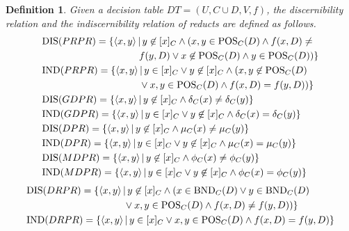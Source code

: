 \documentclass[review]{elsarticle}
\newtheorem{myDef}{Definition}
\begin{document}
		\begin{myDef}
			Given a decision table $DT=(U,C \cup D,V,f)$, the discernibility relation and the indiscernibility relation of reducts are defined as follows.
			\begin{subequations}\begin{align}
					&{\rm DIS}(PRPR)=\{\langle x,y\rangle \,|\, y \not \in [x]_C \wedge (x,y \in {\rm POS}_C(D) \wedge f(x,D) \neq  \notag \\
					&\quad \quad \quad \quad \quad \quad \quad \quad \quad \quad f(y,D) \vee  x \not \in {\rm POS}_C(D) \wedge y \in {\rm POS}_C(D))\}\notag\\
					&{\rm IND}(PRPR)=\{\langle x,y\rangle \,|\,y \in [x]_C \vee y \not \in [x]_C \wedge (x,y \not \in {\rm POS}_C(D) \notag \\
					&\quad \quad \quad \quad \quad \quad \quad \quad \quad \quad \vee x,y \in {\rm POS}_C(D) \wedge f(x,D)=f(y,D) )  \}\notag\\
					&{\rm DIS}(GDPR)=\{ \langle x,y\rangle \,|\,y \not \in [x]_C \wedge \delta_C(x) \neq \delta_C(y) \}\notag\\
					&{\rm IND}(GDPR)=\{\langle x,y\rangle \,|\,y \in [x]_C \vee y \not \in [x]_C \wedge \delta_C(x) = \delta_C(y)\}\notag\\					
					&{\rm DIS}(DPR)=\{\langle x,y\rangle \,|\,y \not \in [x]_C \wedge \mu_C(x) \neq \mu_C(y)\}\notag\\
					&{\rm IND}(DPR)=\{\langle x,y\rangle \,|\,y \in [x]_C \vee y \not \in [x]_C \wedge \mu_C(x) =\mu_C(y)\}\notag\\	
					&{\rm DIS}(MDPR)=\{\langle x,y\rangle \,|\,y \not \in [x]_C \wedge \phi_C(x) \neq \phi_C(y)\}\notag\\
					&{\rm IND}(MDPR)=\{\langle x,y\rangle \,|\,y \in [x]_C \vee y \not \in [x]_C \wedge \phi_C(x) = \phi_C(y)\}\notag
			\end{align}\end{subequations}\begin{subequations}\begin{align}
					&{\rm DIS}(DRPR)=\{\langle x,y\rangle \,|\,y \not \in [x]_C \wedge(x \in {\rm BND}_C(D) \vee y \in {\rm BND}_C(D) \notag\\
					&\quad \quad \quad \quad \quad \quad \quad \quad \quad \quad \vee x,y \in {\rm POS}_C(D) \wedge f(x,D) \neq f(y,D)) \}\notag\\
					&{\rm IND}(DRPR)=\{\langle x,y\rangle \,|\,y \in [x]_C \vee x,y \in {\rm POS}_C(D) \wedge f(x,D)=f(y,D)\}\notag
			\end{align}\end{subequations}
		\end{myDef}
\end{document}
